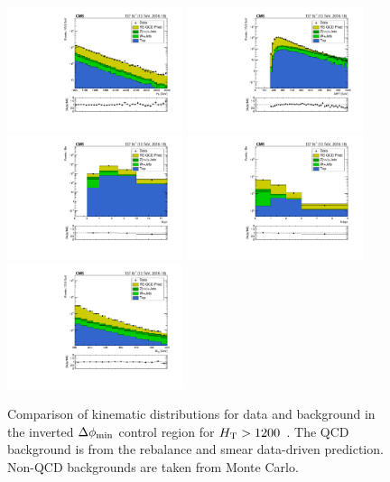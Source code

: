 \begin{figure}[!htbp]
  \begin{center}
    \includegraphics[width=0.46\textwidth]{figs/qcd/rs_data/c_crRSInvertDPhiInclusiveHT1200toInf_h_ht.pdf}
    \includegraphics[width=0.46\textwidth]{figs/qcd/rs_data/c_crRSInvertDPhiInclusiveHT1200toInf_h_met.pdf}
    \includegraphics[width=0.46\textwidth]{figs/qcd/rs_data/c_crRSInvertDPhiInclusiveHT1200toInf_h_nJet30.pdf}
    \includegraphics[width=0.46\textwidth]{figs/qcd/rs_data/c_crRSInvertDPhiInclusiveHT1200toInf_h_nBJet20.pdf}
    \includegraphics[width=0.46\textwidth]{figs/qcd/rs_data/c_crRSInvertDPhiInclusiveHT1200toInf_h_mt2.pdf}
    \caption{Comparison of kinematic distributions for data and background in the inverted $\Delta\phi_{\mathrm{min}}$ control region for $H_{\mathrm{T}} > 1200$~\GeV. The QCD background is from the
             rebalance and smear data-driven prediction. Non-QCD backgrounds are taken from Monte Carlo.
            }
    \label{Fig:rs_crRSInvertDPhiInclusiveHT1200toInf}
  \end{center}
\end{figure}
